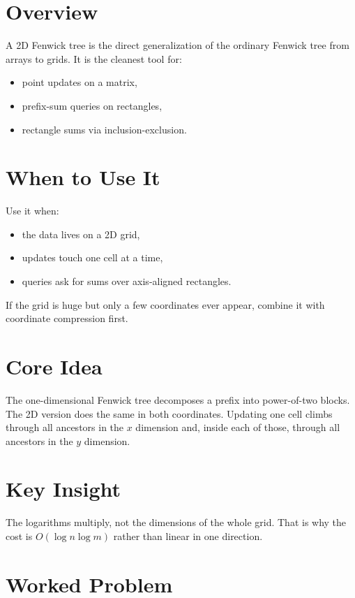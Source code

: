 \section*{Overview}

A 2D Fenwick tree is the direct generalization of the ordinary Fenwick tree from arrays to grids. It is the cleanest
tool for:

\begin{itemize}
  \item point updates on a matrix,
  \item prefix-sum queries on rectangles,
  \item rectangle sums via inclusion-exclusion.
\end{itemize}

\section*{When to Use It}

Use it when:

\begin{itemize}
  \item the data lives on a 2D grid,
  \item updates touch one cell at a time,
  \item queries ask for sums over axis-aligned rectangles.
\end{itemize}

If the grid is huge but only a few coordinates ever appear, combine it with coordinate compression first.

\section*{Core Idea}

The one-dimensional Fenwick tree decomposes a prefix into power-of-two blocks. The 2D version does the same in both
coordinates. Updating one cell climbs through all ancestors in the \(x\) dimension and, inside each of those, through
all ancestors in the \(y\) dimension.

\section*{Key Insight}

The logarithms multiply, not the dimensions of the whole grid. That is why the cost is \(O(\log n \log m)\) rather
than linear in one direction.

\section*{Worked Problem}

